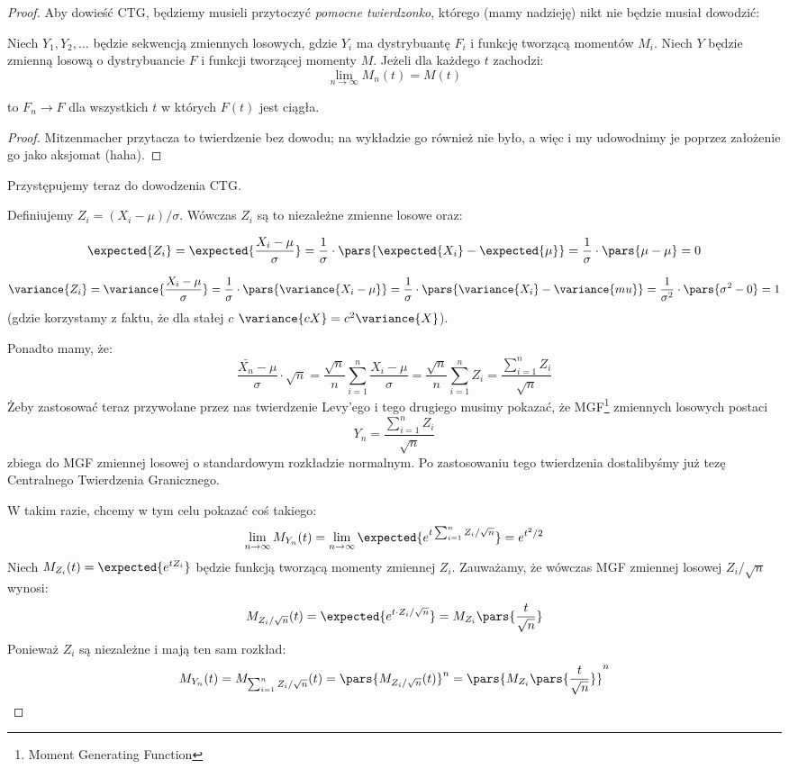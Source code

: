 \begin{proof}
    Aby dowieść CTG, będziemy musieli przytoczyć \textit{pomocne twierdzonko}, którego (mamy nadzieję) nikt nie będzie musiał dowodzić:
    
\begin{theorem} Niech \( Y_1, Y_2, \dots\)
    będzie sekwencją zmiennych losowych, gdzie \(Y_i\) ma dystrybuantę \(F_i\) i funkcję tworzącą momentów \( M_i\). Niech \(Y\) będzie zmienną losową o dystrybuancie \(F\) i funkcji tworzącej momenty \(M\). Jeżeli dla każdego \(t\) zachodzi:
    \[
    \lim_{n \to \infty}M_n(t) = M(t)
    \]
    
    to \(F_n \to F\) dla wszystkich \(t\) w których \( F(t)\) jest ciągła.
\end{theorem}
\begin{proof}
    Mitzenmacher przytacza to twierdzenie bez dowodu; na wykładzie go również nie było, a więc i my udowodnimy je poprzez założenie go jako aksjomat (haha).
\end{proof}

    Przystępujemy teraz do dowodzenia CTG.

    Definiujemy \( Z_i = (X_i - \mu)/\sigma \).
    Wówczas \( Z_i\) są to niezależne zmienne losowe oraz:
    
    \[
        \expected{Z_i} = \expected{\frac{X_i - \mu}{ \sigma}} = \frac{1}{\sigma} \cdot \pars{\expected{X_i} - \expected{\mu}} = \frac{1}{\sigma} \cdot \pars{\mu - \mu} = 0
    \]
    
    \[
    \variance{Z_i} = \variance{\frac{X_i - \mu}{\sigma}} = \frac{1}{\sigma} \cdot \pars{\variance{X_i - \mu}} = \frac{1}{\sigma} \cdot \pars{\variance{X_i} - \variance{mu}} = \frac{1}{\sigma^2} \cdot \pars{\sigma^2 - 0} = 1
    \]
    (gdzie korzystamy z faktu, że dla stałej \(c\) \( \variance{cX} = c^2 \variance{X} \)).

    Ponadto mamy, że:
    \[
    \frac{\bar{X_n} - \mu}{\sigma} \cdot \sqrt{n} = \frac{\sqrt{n}}{n}\sum_{i=1}^{n}\frac{X_i-\mu}{\sigma} = \frac{\sqrt{n}}{n} \sum_{i=1}^{n} Z_i = \frac{\sum_{i=1}^nZ_i}{\sqrt{n}}
    \]
    Żeby zastosować teraz przywołane przez nas twierdzenie Levy'ego i tego drugiego musimy pokazać, że MGF\footnote{Moment Generating Function} zmiennych losowych postaci
    \[
    Y_n = \frac{\sum_{i=1}^nZ_i}{\sqrt{n}}
    \]
    zbiega do MGF zmiennej losowej o standardowym rozkładzie normalnym. Po zastosowaniu tego twierdzenia dostalibyśmy już tezę Centralnego Twierdzenia Granicznego. 
    
    W takim razie, chcemy w tym celu pokazać coś takiego:
    \[
    \lim_{n \to \infty} M_{Y_n}(t) = \lim_{n \to \infty}\expected{e^{t\sum_{i=1}^nZ_i/\sqrt{n}}} = e^{t^2/2}
    \]
    Niech \( M_{Z_i}(t) = \expected{e^{tZ_i}} \) będzie funkcją tworzącą momenty zmiennej \(Z_i\).  Zauważamy, że wówczas MGF zmiennej losowej \( Z_i/\sqrt{n}\) wynosi:
    \[
    M_{Z_i / \sqrt{n}}(t) = \expected{e^{t \cdot Z_i/\sqrt{n}}} = M_{Z_i} \pars{\frac{t}{\sqrt{n}}}
    \]
    Ponieważ \( Z_i\) są niezależne i mają ten sam rozkład:
    \[
    M_{Y_n}(t) = M_{\sum_{i=1}^{n} Z_i / \sqrt{n}} (t) = \pars{M_{Z_i / \sqrt{n}}(t)}^n = \pars{M_{Z_i}\pars{\frac{t}{\sqrt{n}}}}^n
    \]
    

\end{proof}
